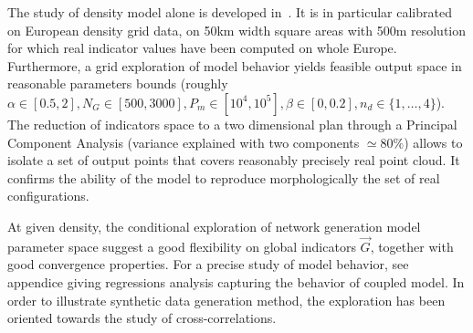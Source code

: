 The study of density model alone is developed in~\cite{raimbault2016calibration}. It is in particular calibrated on European density grid data, on 50km width square areas with 500m resolution for which real indicator values have been computed on whole Europe. Furthermore, a grid exploration of model behavior yields feasible output space in reasonable parameters bounds (roughly $\alpha \in [0.5,2],N_G\in [500,3000], P_m \in [10^4,10^5],\beta\in [0,0.2], n_d \in \{ 1, \ldots , 4\}$). The reduction of indicators space to a two dimensional plan through a Principal Component Analysis (variance explained with two components $\simeq 80\%$) allows to isolate a set of output points that covers reasonably precisely real point cloud. It confirms the ability of the model to reproduce morphologically the set of real configurations.




At given density, the conditional exploration of network generation model parameter space suggest a good flexibility on global indicators $\vec{G}$, together with good convergence properties. For a precise study of model behavior, see appendice giving regressions analysis capturing the behavior of coupled model. In order to illustrate synthetic data generation method, the exploration has been oriented towards the study of cross-correlations.


